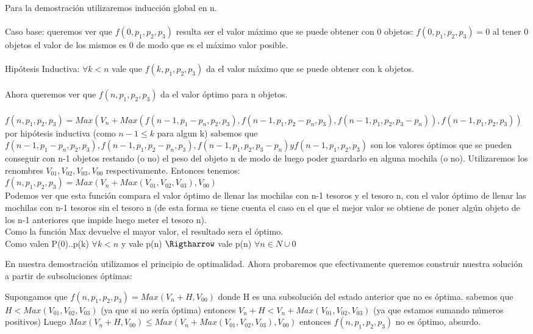\documentclass[spanish,12pt]{article}
\begin{document}
{Para la demostración utilizaremos inducción global en n.
\\
\\
Caso base: queremos ver que $f(0,p_{1},p_{2},p_{3})$ resulta ser el valor máximo que se puede obtener con 0 objetos:
$f(0,p_{1},p_{2},p_{3}) = 0$ al tener 0 objetos el valor de los mismos es 0 de modo que es el máximo valor posible.
\\
\\
Hipótesis Inductiva: $\forall k<n$ vale que $f(k,p_{1},p_{2},p_{3})$ da el valor máximo que se puede obtener con k objetos.
\\
\\
Ahora queremos ver que $f(n,p_{1},p_{2},p_{3})$ da el valor óptimo para n objetos.
\\
\\
$f(n,p_{1},p_{2},p_{3}) = Max(V_{n}+Max(f(n-1,p_{1}-p_{n},p_{2},p_{3}), f(n-1,p_{1},p_{2}-p_{n},p_{3}), f(n-1,p_{1},p_{2},p_{3}-p_{n})),f(n-1,p_{1},p_{2},p_{3})) $ \\
por hipótesis inductiva (como $n-1 \leq k$ para algun k) sabemos que $f(n-1,p_{1}-p_{n},p_{2},p_{3}), f(n-1,p_{1},p_{2}-p_{n},p_{3}), f(n-1,p_{1},p_{2},p_{3}-p_{n}) y f(n-1,p_{1},p_{2},p_{3})$ son los valores óptimos que se pueden conseguir con n-1 objetos restando (o no) el peso del objeto n de modo de luego poder guardarlo en alguna mochila (o no). Utilizaremos los renombres $V_{01},V_{02},V_{03},V_{00}$ respectivamente.
Entonces tenemos: \\
$f(n,p_{1},p_{2},p_{3})= Max(V_{n}+Max(V_{01},V_{02},V_{03}),V_{00})$\\
Podemos ver que esta función  compara el valor óptimo de llenar las mochilas con n-1 tesoros y el tesoro n, con el valor óptimo de llenar las mochilas con n-1 tesoros sin el tesoro n (de esta forma se tiene cuenta el caso en el que el mejor valor se obtiene de poner algún objeto  de los n-1 anteriores que impide luego meter el tesoro n).\\
Como la función Max devuelve el mayor valor, el resultado sera el óptimo.
\\
Como valen P(0)..p(k) $\forall k<n$ y vale p(n) $\Rigtharrow$ vale p(n) $\forall n \in N \cup {0} $

En nuestra demostración utilizamos el principio de optimalidad. Ahora probaremos que efectivamente queremos construir nuestra solución a partir de subsoluciones óptimas:

Supongamos que $f(n,p_{1},p_{2},p_{3}) = Max(V_{n} + H, V_{00})$ donde H es una subsolución del estado anterior que no es óptima. sabemos que $ H < Max(V_{01},V_{02},V_{03})$ (ya que si no sería óptima) entonces $V_{n}+H < V_{n}+Max(V_{01},V_{02},V_{03})$ (ya que estamos sumando números positivos) Luego $Max(V_{n}+H,V_{00}) \leq Max(V_{n}+Max(V_{01},V_{02},V_{03}), V_{00})$ entonces $f(n,p_{1},p_{2},p_{3})$ no es óptimo, absurdo.



}
\end{document}
